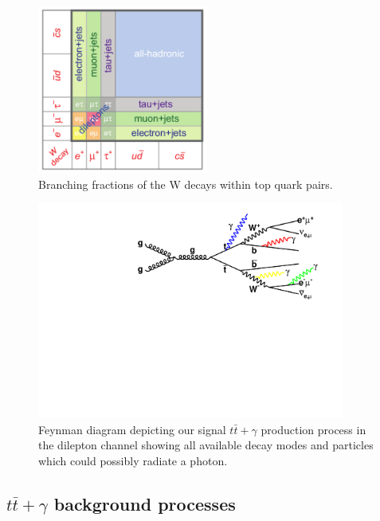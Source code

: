 \begin{figure} [h!]
\begin{center}
\includegraphics[width=0.5\textwidth]{Figures/ttbarDecayFractions.png}
\end{center}
\caption{Branching fractions of the W decays within top quark pairs. \cite{ttbarDecayFractions}}
\label{fig-ttbarDecay}
\end{figure}

\begin{figure} 
\begin{center}
\includegraphics[width=0.9\textwidth]{Figures/ttgammaFeynmanDiagram.pdf}
\end{center}
\caption{Feynman diagram depicting our signal $t\bar{t}+\gamma$ production process in the dilepton channel showing all available decay modes and particles which could possibly radiate a photon.}
\label{fig-ttgammaFeynmanDiagram}
\end{figure}

\subsection{$t\bar{t}+\gamma$ background processes} \label{subsec-ttgammabackgrounds}

